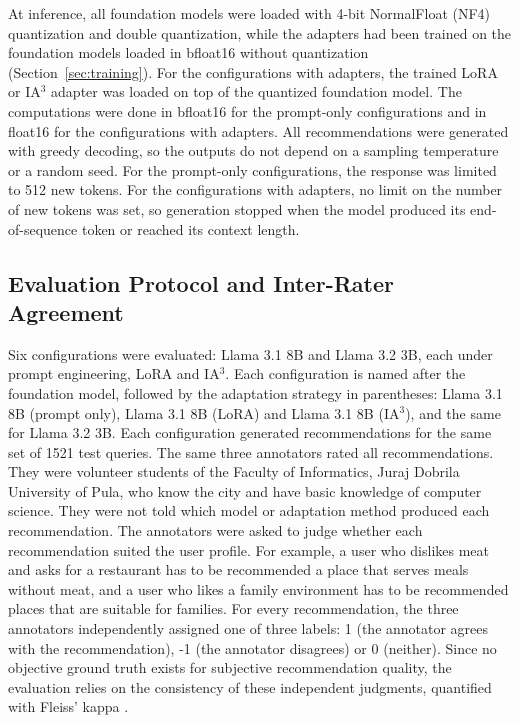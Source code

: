 \documentclass[journal,article,submit,pdftex,moreauthors]{Definitions/mdpi}
\begin{document}
At inference, all foundation models were loaded with 4-bit NormalFloat (NF4) quantization and double quantization, while the adapters had been trained on the foundation models loaded in bfloat16 without quantization (Section~\ref{sec:training}). For the configurations with adapters, the trained LoRA or IA$^3$ adapter was loaded on top of the quantized foundation model. The computations were done in bfloat16 for the prompt-only configurations and in float16 for the configurations with adapters. All recommendations were generated with greedy decoding, so the outputs do not depend on a sampling temperature or a random seed. For the prompt-only configurations, the response was limited to 512 new tokens. For the configurations with adapters, no limit on the number of new tokens was set, so generation stopped when the model produced its end-of-sequence token or reached its context length.

\subsection{Evaluation Protocol and Inter-Rater Agreement}\label{sec:eval}
Six configurations were evaluated: Llama 3.1 8B and Llama 3.2 3B, each under prompt engineering, LoRA and IA$^3$. Each configuration is named after the foundation model, followed by the adaptation strategy in parentheses: Llama 3.1 8B (prompt only), Llama 3.1 8B (LoRA) and Llama 3.1 8B (IA$^3$), and the same for Llama 3.2 3B. Each configuration generated recommendations for the same set of 1521 test queries. The same three annotators rated all recommendations. They were volunteer students of the Faculty of Informatics, Juraj Dobrila University of Pula, who know the city and have basic knowledge of computer science. They were not told which model or adaptation method produced each recommendation. The annotators were asked to judge whether each recommendation suited the user profile. For example, a user who dislikes meat and asks for a restaurant has to be recommended a place that serves meals without meat, and a user who likes a family environment has to be recommended places that are suitable for families. For every recommendation, the three annotators independently assigned one of three labels: 1 (the annotator agrees with the recommendation), -1 (the annotator disagrees) or 0 (neither). Since no objective ground truth exists for subjective recommendation quality, the evaluation relies on the consistency of these independent judgments, quantified with Fleiss' kappa \citep{fleiss1971measuring}.
\end{document}
